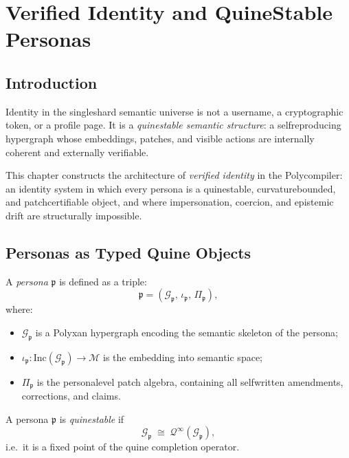 \chapter{Verified Identity and Quine\textendash Stable Personas}
\label{ch:verified-identity}

\section{Introduction}

Identity in the single\textendash shard semantic universe is not a username,
a cryptographic token, or a profile page.  
It is a \emph{quine\textendash stable semantic structure}:
a self\textendash reproducing hypergraph whose embeddings, patches, and
visible actions are internally coherent and externally verifiable.

This chapter constructs the architecture of
\emph{verified identity} in the Polycompiler:
an identity system in which every persona is a quine\textendash stable,
curvature\textendash bounded, and patch\textendash certifiable object,
and where impersonation, coercion, and epistemic drift are
structurally impossible.

\section{Personas as Typed Quine Objects}

A \emph{persona} $\mathfrak{p}$ is defined as a triple:
\[
\mathfrak{p} = (\mathcal{G}_{\mathfrak{p}},\, \iota_{\mathfrak{p}},\, \Pi_{\mathfrak{p}}),
\]
where:

\begin{itemize}
  \item $\mathcal{G}_{\mathfrak{p}}$ is a Polyxan hypergraph encoding the
        semantic skeleton of the persona;
  \item $\iota_{\mathfrak{p}} : \mathrm{Inc}(\mathcal{G}_{\mathfrak{p}}) \to \mathcal{M}$
        is the embedding into semantic space;
  \item $\Pi_{\mathfrak{p}}$ is the persona\textendash level patch algebra,
        containing all self\textendash written amendments, corrections, and claims.
\end{itemize}

\begin{definition}
A persona $\mathfrak{p}$ is \emph{quine\textendash stable} if
\[
\mathcal{G}_{\mathfrak{p}}
  \;\cong\; \mathcal{Q}^\infty(\mathcal{G}_{\mathfrak{p}}),
\]
i.e.\ it is a fixed point of the quine completion operator.
\end{definition}

